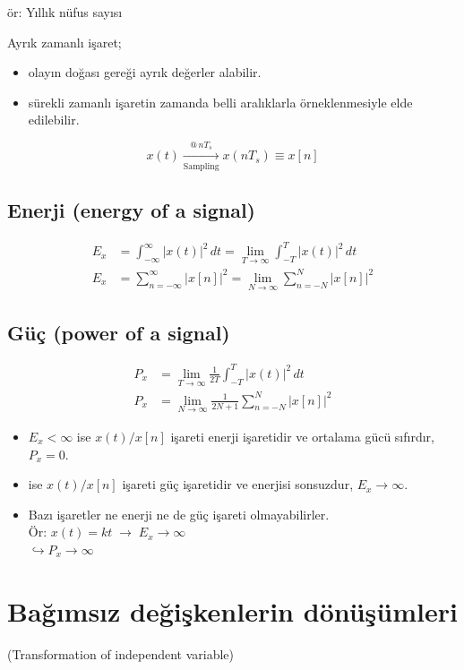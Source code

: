\documentclass[11pt,a4paper]{article}
\begin{document}
ör: Yıllık nüfus sayısı

Ayrık zamanlı işaret;
\begin{itemize}[label=--]
  \item olayın doğası gereği ayrık değerler alabilir.
  \item sürekli zamanlı işaretin zamanda belli aralıklarla örneklenmesiyle elde edilebilir.
\end{itemize}
\[ x(t) \xrightarrow[\text{Sampling}]{@\,nT_s} x(nT_s) \equiv x[n] \]

\subsection{Enerji (energy of a signal)}
\begin{align*}
  E_x &= \int_{-\infty}^{\infty} |x(t)|^2\,dt = \lim_{T\to\infty} \int_{-T}^{T} |x(t)|^2\,dt \\
  E_x &= \sum_{n=-\infty}^{\infty} |x[n]|^2 = \lim_{N\to\infty} \sum_{n=-N}^{N} |x[n]|^2
\end{align*}

\subsection{Güç (power of a signal)}
\begin{align*}
  P_x &= \lim_{T\to\infty} \frac{1}{2T} \int_{-T}^{T} |x(t)|^2\,dt \\
  P_x &= \lim_{N\to\infty} \frac{1}{2N+1} \sum_{n=-N}^{N} |x[n]|^2
\end{align*}

\begin{itemize}[label=$*$]
  \item $E_x<\infty$ ise $x(t)/x[n]$ işareti enerji işaretidir ve ortalama gücü sıfırdır, $P_x=0$.
  \item {} ise $x(t)/x[n]$ işareti güç işaretidir ve enerjisi sonsuzdur, $E_x\to\infty$.
  \item Bazı işaretler ne enerji ne de güç işareti olmayabilirler.\\
  Ör: $x(t)=kt \;\longrightarrow\; E_x\to\infty$\\
  \phantom{Ör: $x(t)=kt$\;}$\hookrightarrow P_x\to\infty$
\end{itemize}

\section{Bağımsız değişkenlerin dönüşümleri}
(Transformation of independent variable)
\end{document}
